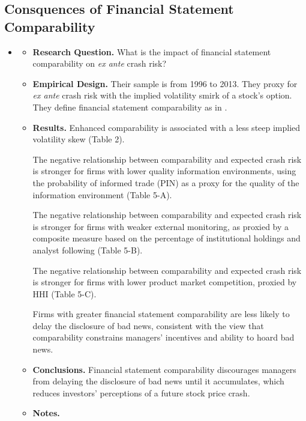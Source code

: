 \documentclass[12pt, letterpaper]{article}
\begin{document}
\subsection{Consquences of Financial Statement Comparability}
\begin{itemize}
\item \cite{kimetal2016}
    \begin{itemize}
    \item \textbf{Research Question.} What is the impact of financial statement comparability on 
\emph{ex ante} crash risk?

    \item \textbf{Empirical Design.} Their sample is from 1996 to 2013. They proxy for \emph{ex 
ante} crash risk with the implied volatility smirk of a stock's option. They define financial 
statement comparability as in \cite{defrancoetal2011}.

    \item \textbf{Results.} Enhanced comparability is associated with a less steep implied 
volatility skew (Table 2). 
    
The negative relationship between comparability and expected crash risk is stronger for firms 
with lower quality information environments, using the probability of informed trade (PIN) as a 
proxy for the quality of the information environment (Table 5-A).
    
The negative relationship between comparability and expected crash risk is stronger for firms 
with weaker external monitoring, as proxied by a composite measure based on the percentage of 
institutional holdings and analyst following (Table 5-B).
    
The negative relationship between comparability and expected crash risk is stronger for firms 
with lower product market competition, proxied by HHI (Table 5-C).

Firms with greater financial statement comparability are less likely to delay the disclosure of bad 
news, consistent with the view that comparability constrains managers' incentives and ability to 
hoard bad news.

    \item \textbf{Conclusions.} Financial statement comparability discourages managers from 
delaying the disclosure of bad news until it accumulates, which reduces investors' perceptions of a 
future stock price crash.
    
    \item \textbf{Notes.} 
    \end{itemize}

\end{itemize}
\end{document}
